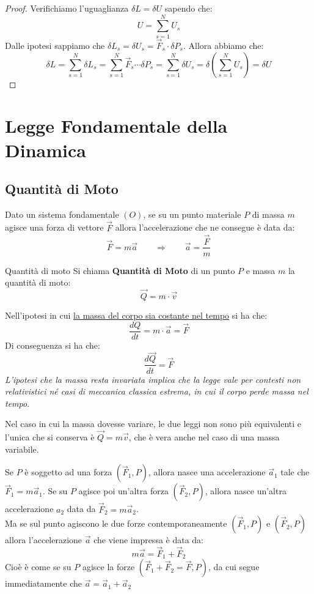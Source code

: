 \documentclass[11pt,a4paper,twoside]{article}
\theoremstyle{definition}
\begin{document}
\begin{proof}
	Verifichiamo l'uguaglianza $\delta L = \delta U$ sapendo che:
	\[U = \sum_{s =1}^N U_s\]
	Dalle ipotesi sappiamo che $\delta L_s = \delta U_s = \vec F_s \cdot \delta P_s$. Allora abbiamo che:
	\[ \delta L = \sum_{s = 1}^N \delta L_s = \sum_{s = 1}^N\vec F_s \cdots \delta P_s = \sum_{s = 1}^N \delta U_s = \delta\left(\sum_{s = 1}^N U_s\right) = \delta U \]
\end{proof}

\newpage

\section{Legge Fondamentale della Dinamica}

\subsection{Quantità di Moto}\label{qta}

Dato un sistema fondamentale $(O)$, se su un punto materiale $P$ di massa $m$ agisce una forza di vettore $\vec F$ allora l'accelerazione che ne consegue è data da:
\[ \vec F = m\vec a \qquad \Rightarrow \qquad \vec a = \frac{\vec F}m \]

\begin{defn}{Quantità di moto}{}
	Si chiama \textbf{Quantità di Moto} di un punto $P$ e massa $m$ la quantità di moto:
	\[ \vec Q = m\cdot \vec v \]
\end{defn}

Nell'ipotesi in cui \underline{la massa del corpo sia costante nel tempo} si ha che:
\[ \frac{dQ}{dt} = m \cdot \vec a = \vec F\]
Di conseguenza si ha che:
\[ \frac{d\vec Q}{dt} = \vec F \]
\textit{L'ipotesi che la massa resta invariata implica che la legge vale per contesti non relativistici né casi di meccanica classica estrema, in cui il corpo perde massa nel tempo}.

Nel caso in cui la massa dovesse variare, le due leggi non sono più equivalenti e l'unica che si conserva è $\vec Q = m \vec v$, che è vera anche nel caso di una massa variabile.

Se $P$ è soggetto ad una forza $(\vec F_1, P)$, allora nasce una accelerazione $\vec a_1$ tale che $\vec F_1 = m\vec a_1$. Se su $P$ agisce poi un'altra forza $(\vec F_2, P)$, allora nasce un'altra accelerazione $a_2$ data da $\vec F_2 = m \vec a_2$.\\
Ma se sul punto agiscono le due forze contemporaneamente $(\vec F_1, P)$ e $(\vec F_2, P)$ allora l'accelerazione $\vec a$ che viene impressa è data da:
\[ m\vec a = \vec F_1 + \vec F_2 \]
Cioè è come se su $P$ agisce la forze $(\vec F_1 + \vec F_2 = \vec F, P)$, da cui segue immediatamente che $\vec a = \vec a_1 + \vec a_2$
\end{document}
